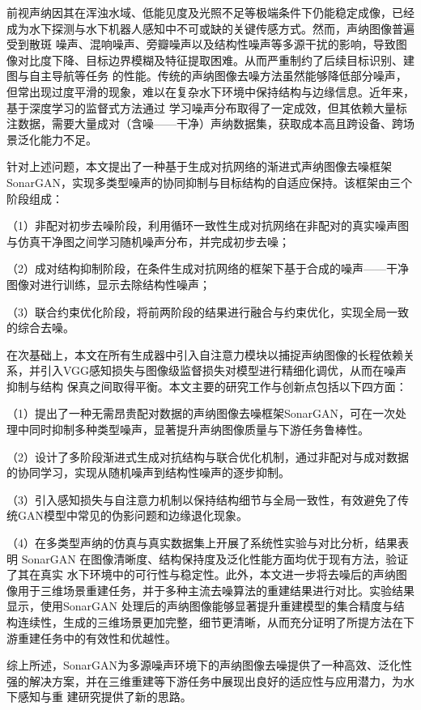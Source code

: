 \begin{cabstract}
前视声纳因其在浑浊水域、低能见度及光照不足等极端条件下仍能稳定成像，已经成为水下探测与水下机器人感知中不可或缺的关键传感方式。然而，声纳图像普遍受到散斑
噪声、混响噪声、旁瓣噪声以及结构性噪声等多源干扰的影响，导致图像对比度下降、目标边界模糊及特征提取困难。从而严重制约了后续目标识别、建图与自主导航等任务
的性能。传统的声纳图像去噪方法虽然能够降低部分噪声，但常出现过度平滑的现象，难以在复杂水下环境中保持结构与边缘信息。近年来，基于深度学习的监督式方法通过
学习噪声分布取得了一定成效，但其依赖大量标注数据，需要大量成对（含噪——干净）声纳数据集，获取成本高且跨设备、跨场景泛化能力不足。

针对上述问题，本文提出了一种基于生成对抗网络的渐进式声纳图像去噪框架SonarGAN，实现多类型噪声的协同抑制与目标结构的自适应保持。该框架由三个阶段组成：

（1）非配对初步去噪阶段，利用循环一致性生成对抗网络在非配对的真实噪声图与仿真干净图之间学习随机噪声分布，并完成初步去噪；

（2）成对结构抑制阶段，在条件生成对抗网络的框架下基于合成的噪声——干净图像对进行训练，显示去除结构性噪声；

（3）联合约束优化阶段，将前两阶段的结果进行融合与约束优化，实现全局一致的综合去噪。

在次基础上，本文在所有生成器中引入自注意力模块以捕捉声纳图像的长程依赖关系，并引入VGG感知损失与图像级监督损失对模型进行精细化调优，从而在噪声抑制与结构
保真之间取得平衡。本文主要的研究工作与创新点包括以下四方面：

（1）提出了一种无需昂贵配对数据的声纳图像去噪框架SonarGAN，可在一次处理中同时抑制多种类型噪声，显著提升声纳图像质量与下游任务鲁棒性。

（2）设计了多阶段渐进式生成对抗结构与联合优化机制，通过非配对与成对数据的协同学习，实现从随机噪声到结构性噪声的逐步抑制。

（3）引入感知损失与自注意力机制以保持结构细节与全局一致性，有效避免了传统GAN模型中常见的伪影问题和边缘退化现象。

（4）在多类型声纳的仿真与真实数据集上开展了系统性实验与对比分析，结果表明 SonarGAN 在图像清晰度、结构保持度及泛化性能方面均优于现有方法，验证了其在真实
水下环境中的可行性与稳定性。此外，本文进一步将去噪后的声纳图像用于三维场景重建任务，并于多种主流去噪算法的重建结果进行对比。实验结果显示，使用SonarGAN
处理后的声纳图像能够显著提升重建模型的集合精度与结构连续性，生成的三维场景更加完整，细节更清晰，从而充分证明了所提方法在下游重建任务中的有效性和优越性。

综上所述，SonarGAN为多源噪声环境下的声纳图像去噪提供了一种高效、泛化性强的解决方案，并在三维重建等下游任务中展现出良好的适应性与应用潜力，为水下感知与重
建研究提供了新的思路。

\end{cabstract}

